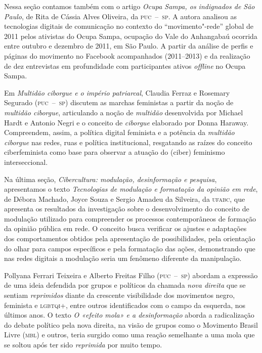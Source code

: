 Nessa seção contamos também com o artigo \textit{Ocupa Sampa, os indignados de São Paulo}, de Rita de Cássia Alves Oliveira, da \textsc{puc~--~sp}. A autora analisou
as tecnologias digitais de comunicação no contexto do
``movimento"-rede'' global de 2011 pelos ativistas do Ocupa Sampa,
ocupação do Vale do Anhangabaú ocorrida entre outubro e dezembro de
2011, em São Paulo. A partir da análise de perfis e páginas do movimento
no Facebook acompanhados (2011--2013) e da realização de dez entrevistas
em profundidade com participantes ativos \textit{offline} no Ocupa Sampa.

Em \textit{Multidão ciborgue e o império patriarcal}, Claudia Ferraz e
Rosemary Segurado (\textsc{puc~--~sp}) discutem as marchas feministas a partir da
noção de \textit{multidão ciborgue}, articulando a noção de \textit{multidão} desenvolvida
por Michael Hardt e Antonio Negri e o conceito de \textit{ciborgue} elaborado por
Donna Haraway. Compreendem, assim, a política digital feminista e a
potência da \textit{multidão ciborgue} nas redes, ruas e política institucional,
resgatando as raízes do conceito ciberfeminista como base para observar
a atuação do (ciber) feminismo interseccional.

Na última seção, \textit{Cibercultura: modulação, desinformação e
pesquisa}, apresentamos o texto \textit{Tecnologias de modulação e
formatação da opinião em rede}, de Débora Machado, Joyce Souza e Sergio
Amadeu da Silveira, da \textsc{ufabc}, que apresenta os resultados da
investigação sobre o desenvolvimento do conceito de modulação utilizado
para compreender os processos contemporâneos de formação da opinião
pública em rede. O conceito busca verificar os ajustes e adaptações dos
comportamentos obtidos pela apresentação de possibilidades, pela
orientação do olhar para campos específicos e pela formatação das ações,
demonstrando que nas redes digitais a modulação seria um fenômeno
diferente da manipulação.

Pollyana Ferrari Teixeira e Alberto Freitas Filho (\textsc{puc~--~sp}) abordam a
expressão de uma ideia defendida por grupos e políticos da
chamada \textit{nova direita} que se sentiam \textit{reprimidos} diante da
crescente visibilidade dos movimentos negro, feminista e \textsc{lgbtqi}+, entre
outros identificados com o campo da esquerda, nos últimos anos. O texto
\textit{O «efeito mola» e a desinformação} aborda a radicalização do debate
político pela nova direita, na visão de grupos como o Movimento Brasil
Livre (\textsc{mbl}) e outros, teria surgido como uma reação semelhante a uma
mola que se soltou após ter sido \textit{reprimida} por muito tempo.

